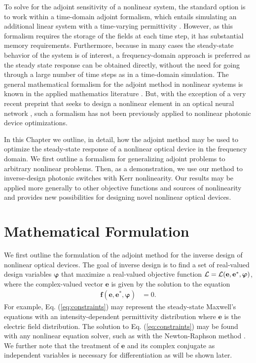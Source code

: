 To solve for the adjoint sensitivity of a nonlinear system, the standard option is to work within a time-domain adjoint formalism, which entails simulating an additional linear system with a time-varying permittivity \cite{elesin_design_2012}.  However, as this formalism requires the storage of the fields at each time step, it has substantial memory requirements.  Furthermore, because in many cases the steady-state behavior of the system is of interest, a frequency-domain approach is preferred as the steady state response can be obtained directly, without the need for going through a large number of time steps as in a time-domain simulation.  The general mathematical formalism for the adjoint method in nonlinear systems is known in the applied mathematics literature \cite{Strang2007}. But, with the exception of a very recent preprint that seeks to design a nonlinear element in an optical neural network  \cite{khoram2018stochastic}, such a formalism has not been previously applied to nonlinear photonic device optimizations.

In this Chapter we outline, in detail, how the adjoint method may be used to optimize the steady-state response of a nonlinear optical device in the frequency domain. We first outline a formalism for generalizing adjoint problems to arbitrary nonlinear problems.  Then, as a demonstration, we use our method to inverse-design photonic switches with Kerr nonlinearity.  Our results may be applied more generally to other objective functions and sources of nonlinearity and provides new possibilities for designing novel nonlinear optical devices.

\section{Mathematical Formulation}

We first outline the formulation of the adjoint method for the inverse design of nonlinear optical devices.  The goal of inverse design is to find a set of real-valued design variables $\bm{\varphi}$ that maximize a real-valued objective function $\mathbf{\mathcal{L}} = \mathbf{\mathcal{L}}(\mathbf{e}, \mathbf{e}^*, \bm{\varphi})$, where the complex-valued vector $\mathbf{e}$ is given by the solution to the equation
%
\begin{align}
\mathbf{f}(\mathbf{e}, \mathbf{e}^*, \bm{\varphi}) &= 0
\label{eq:constraints}.
\end{align}
%
For example, Eq. (\ref{eq:constraints}) may represent the steady-state Maxwell's equations with an intensity-dependent permittivity distribution where $\mathbf{e}$ is the electric field distribution.  The solution to Eq. (\ref{eq:constraints}) may be found with any nonlinear equation solver, such as with the Newton-Raphson method \cite{press2007numerical}.  We further note that the treatment of $\mathbf{e}$ and its complex conjugate as independent variables is necessary for differentiation as will be shown later.

